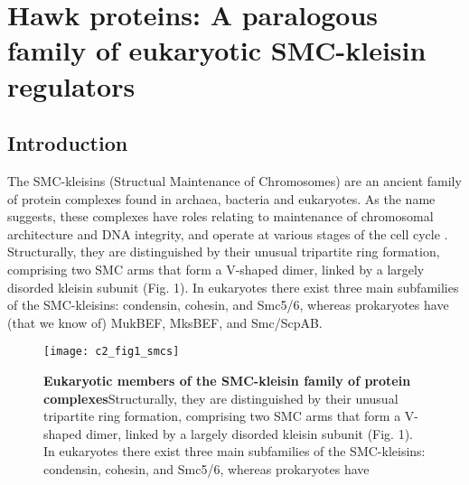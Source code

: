 \documentclass[a4paper,11pt,twoside,openright]{scrbook}
\begin{document}
\chapter{Hawk proteins: A paralogous family of eukaryotic SMC-kleisin regulators}


\section{Introduction}
The SMC-kleisins (Structual Maintenance of Chromosomes) are an ancient family of protein complexes found in archaea, bacteria and eukaryotes. As the name suggests, these complexes have roles relating to maintenance of chromosomal architecture and DNA integrity, and operate at various stages of the cell cycle \cite{Nasmyth2009, Hirano2016}. Structurally, they are distinguished by their unusual tripartite ring formation, comprising two SMC arms that form a V-shaped dimer, linked by a largely disorded kleisin subunit (Fig. 1). In eukaryotes there exist three main subfamilies of the SMC-kleisins: condensin, cohesin, and Smc5/6, whereas prokaryotes have (that we know of) MukBEF, MksBEF, and Smc/ScpAB.

\begin{figure}[h]
\fcapsideright
    {\caption[Eukaryotic members of the SMC-kleisin family of protein complexes]{\sffamily\textbf{Eukaryotic members of the SMC-kleisin family of protein complexes}\newline \rmfamily Structurally, they are distinguished by their unusual tripartite ring formation, comprising two SMC arms that form a V-shaped dimer, linked by a largely disorded kleisin subunit (Fig. 1). In eukaryotes there exist three main subfamilies of the SMC-kleisins: condensin, cohesin, and Smc5/6, whereas prokaryotes have }}
    {\texttt{[image: c2\_fig1\_smcs]}}
\end{figure}
\end{document}
